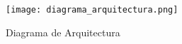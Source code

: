 
\begin{figure}[htbp]
    \centering
    \texttt{[image: diagrama\_arquitectura.png]}
    \caption{Diagrama de Arquitectura}
    \label{fig:arquitectura}
\end{figure}

